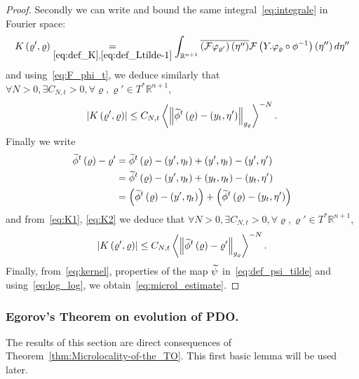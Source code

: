\documentclass[10pt]{amsart}
\theoremstyle{definition}\newtheorem{defi}[theo]{Definition}\newtheorem{rema}[theo]{Remark}\newtheorem{exam}[theo]{Example}\newtheorem{exem}[theo]{Example}\newtheorem{nota}[theo]{Notation}
\newcommand{\clF}{\mathcal{F}}
\newcommand{\bbR}{\mathbb{R}}
\let\oldtilde\tilde
\renewcommand*{\tilde}[1]{\mathchoice{\widetilde{#1}}{\widetilde{#1}}{\oldtilde{#1}}{\oldtilde{#1}}}
\let\oldexists\exists
\renewcommand*{\exists}{\mathrel{\oldexists}}
\let\oldforall\forall
\renewcommand*{\forall}{\mathrel{\oldforall}}
\begin{document}
\begin{proof}
Secondly we can write and bound the same integral~\eqref{eq:integrale} in Fourier space:
\[
K\left(\varrho',\varrho\right)\underset{\eqref{eq:def_K},\eqref{eq:def_Ltilde-1}}{=}\int_{\bbR^{n+1}}\overline{\left(\clF\varphi_{\varrho'}\right)\left(\eta''\right)}\clF\left(Y.\varphi_{\varrho}\circ\phi^{-1}\right)\left(\eta''\right)d\eta''
\]
and using~\eqref{eq:F_phi_t}, we deduce similarly that $\forall N>0,\exists C_{N,t}>0,\forall\varrho,\varrho'\in T^{*}\bbR^{n+1}$,
\begin{equation}
\left|K\left(\varrho',\varrho\right)\right|\leq C_{N,t}\left\langle \left\Vert \tilde{\phi}^{t}\left(\varrho\right)-\left(y_{t},\eta'\right)\right\Vert _{g_{\varrho}}\right\rangle ^{-N}.\label{eq:K2}
\end{equation}
Finally we write
\begin{align*}
\tilde{\phi}^{t}\left(\varrho\right)-\varrho' & =\tilde{\phi}^{t}\left(\varrho\right)-\left(y',\eta_{t}\right)+\left(y',\eta_{t}\right)-\left(y',\eta'\right)\\
& =\tilde{\phi}^{t}\left(\varrho\right)-\left(y',\eta_{t}\right)+\left(y_{t},\eta_{t}\right)-\left(y_{t},\eta'\right)\\
& =\left(\tilde{\phi}^{t}\left(\varrho\right)-\left(y',\eta_{t}\right)\right)+\left(\tilde{\phi}^{t}\left(\varrho\right)-\left(y_{t},\eta'\right)\right)
\end{align*}
and from~\eqref{eq:K1}, \eqref{eq:K2} we deduce that $\forall N>0,\exists C_{N,t}>0,\forall\varrho,\varrho'\in T^{*}\bbR^{n+1}$,
\[
\left|K\left(\varrho',\varrho\right)\right|\leq C_{N,t}\left\langle \left\Vert \tilde{\phi}^{t}\left(\varrho\right)-\varrho'\right\Vert _{g_{\varrho}}\right\rangle ^{-N}.
\]
Finally, from~\eqref{eq:kernel}, properties of the map $\tilde{\psi}$ in~\eqref{eq:def_psi_tilde} and using~\eqref{eq:log_log}, we obtain~\eqref{eq:microl_estimate}.
\end{proof}

\subsubsection{Egorov's Theorem on evolution of PDO.}

The results of this section are direct consequences of Theorem~\ref{thm:Microlocality-of-the_TO}. This first basic lemma will be used later.
\end{document}

